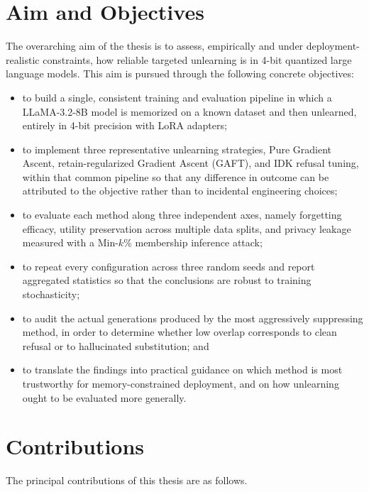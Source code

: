 \documentclass[a4paper,12pt]{report}
\begin{document}
\section{Aim and Objectives}
The overarching aim of the thesis is to assess, empirically and under deployment-realistic constraints, how reliable targeted unlearning is in 4-bit quantized large language models. This aim is pursued through the following concrete objectives:

\begin{itemize}
	\item to build a single, consistent training and evaluation pipeline in which a LLaMA-3.2-8B model is memorized on a known dataset and then unlearned, entirely in 4-bit precision with LoRA adapters;
	\item to implement three representative unlearning strategies, Pure Gradient Ascent, retain-regularized Gradient Ascent (GAFT), and IDK refusal tuning, within that common pipeline so that any difference in outcome can be attributed to the objective rather than to incidental engineering choices;
	\item to evaluate each method along three independent axes, namely forgetting efficacy, utility preservation across multiple data splits, and privacy leakage measured with a Min-$k$\% membership inference attack;
	\item to repeat every configuration across three random seeds and report aggregated statistics so that the conclusions are robust to training stochasticity;
	\item to audit the actual generations produced by the most aggressively suppressing method, in order to determine whether low overlap corresponds to clean refusal or to hallucinated substitution; and
	\item to translate the findings into practical guidance on which method is most trustworthy for memory-constrained deployment, and on how unlearning ought to be evaluated more generally.
\end{itemize}

\section{Contributions}
The principal contributions of this thesis are as follows.
\end{document}

